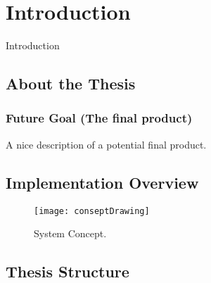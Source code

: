 \chapter{Introduction}
\label{chp:introduction} 

Introduction
\section{About the Thesis}

\subsection{Future Goal (The final product)}
A nice description of a potential final product.

\section{Implementation Overview}

\begin{figure}[p]
	\centering
	\texttt{[image: conseptDrawing]}
	\caption{System Concept. }
	\label{fig:conseptDrawing}
\end{figure}

\section{Thesis Structure}